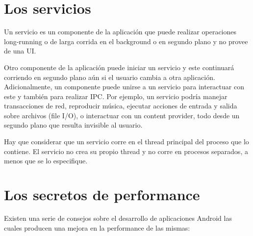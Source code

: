 \section{Los servicios}
\label{sec:services}

Un servicio es un componente de la aplicaci\'on que puede realizar operaciones long-running o de larga corrida en el background o en segundo plano y no provee de una \ac{UI}.

Otro componente de la aplicaci\'on puede iniciar un servicio y este continuar\'a corriendo en segundo plano a\'un si el usuario cambia a otra aplicaci\'on. Adicionalmente, un componente puede unirse a un servicio para interactuar con este y tambi\'en para realizar \ac{IPC}. Por ejemplo, un servicio podr\'ia manejar transacciones de red, reproducir m\'usica, ejecutar acciones de entrada y salida sobre archivos (file I/O), o interactuar con un content provider, todo desde un segundo plano que resulta invisible al usuario.

Hay que considerar que un servicio corre en el thread principal del proceso que lo contiene. El servicio no crea su propio thread y no corre en procesos separados, a menos que se lo especifique.

\section{Los secretos de performance}
\label{sec:performance.secrets}

Existen una serie de consejos sobre el desarrollo de aplicaciones Android las cuales producen una mejora en la performance de las mismas:

